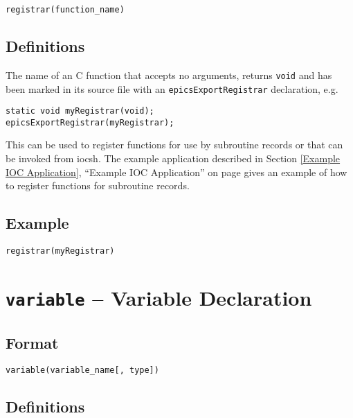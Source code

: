 \begin{verbatim}
registrar(function_name)
\end{verbatim}

\subsection{Definitions}

\begin{description}
\item [function\_name] The name of an C function that accepts no arguments, returns \verb|void| and has been marked in
its source file with an \verb|epicsExportRegistrar| declaration, e.g.
\end{description}

\begin{verbatim}
static void myRegistrar(void);
epicsExportRegistrar(myRegistrar);
\end{verbatim}

This can be used to register functions for use by subroutine records or that can be invoked from iocsh. The example 
application described in Section \ref{Example IOC Application}, ``Example IOC Application'' on page \pageref{Example IOC Application}
gives an example of how to register functions for subroutine records.

\subsection{Example}

\begin{verbatim}
registrar(myRegistrar)
\end{verbatim}

\section{\texttt{variable} -- Variable Declaration}

\subsection{Format}

\begin{verbatim}
variable(variable_name[, type])
\end{verbatim}

\subsection{Definitions}


